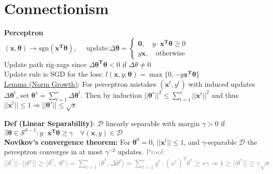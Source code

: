 \section*{Connectionism}
\textbf{Perceptron}\\[-.2cm]
$(\mathbf{x,\theta})\rightarrow \text{sgn}(\mathbf{x^T\theta}),\quad$  update:\hfill  $\Delta\mathbf{\theta}=\begin{cases} 
       \mathbf{0}, \quad y \cdot \mathbf{x^T\theta}\geq 0\\
       y\mathbf x, \quad \text{otherwise}
       \end{cases}$\\
Update path zig-zags since $\Delta\mathbf{\theta^T\theta}<0$ if \(\Delta \theta \not = 0\)\\
Update rule is SGD for the loss: $l(\mathbf x,y;\mathbf\theta)=\max\{0,-y\mathbf{x^T\theta}\}$\\
\underline{Lemma (Norm Growth)}: For perceptron mistakes $(\mathbf x^t, y^t)$ with induced updates $\Delta\mathbf\theta^t$, set  $\mathbf\theta^s=\sum_{t=1}^s\Delta\mathbf\theta^t$. Then by induction $||\mathbf\theta^s||^2\leq\sum_{t=1}^s||\mathbf x^t||^2$ and thus $||\mathbf x^t||\leq 1 \!\Rightarrow\! ||\mathbf\theta^s||\leq\sqrt s$

\textbf{Def (Linear Separability)}:  $\mathcal{D}$ linearly separable with margin $\gamma>0$ if $\exists \mathbf\theta \in \mathcal{S}^{d-1} :y \cdot \mathbf{x^T\theta}\geq\gamma \quad \forall(\mathbf x, y)\in\mathcal D$\\


\textbf{Novikov's convergence theorem:} For $\mathbf\theta^0 = 0$, $||\mathbf x^t||\leq 1$, and \(\gamma\)-separable \(\mathcal{D}\) the perceptron converges in at most $\gamma^{-2}$ updates. \textcolor{gray}{Proof: $||\theta^*|| \cdot  ||\theta^s|| \geq \langle \theta^*,\ \theta^s) =\sum_{t=1}^s \langle \theta^*,  \Delta\theta^t \rangle   = \sum_{t=1}^s y^t \cdot (x^t)^T \theta^* \geq s \gamma  \Rightarrow 1 \geq ||\theta^*|| \geq \gamma \sqrt{s}$}
\color{red}